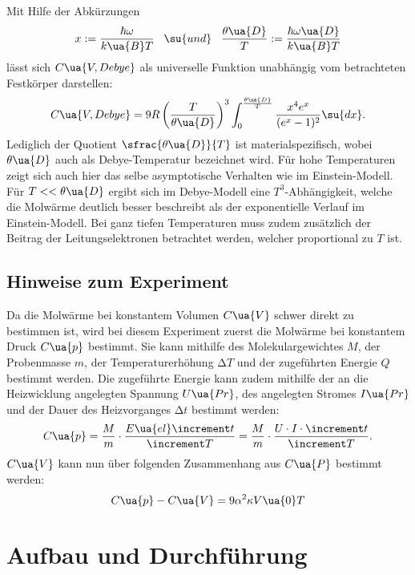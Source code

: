 Mit Hilfe der Abkürzungen
\begin{equation}
  x:=\frac{\hbar\omega}{k\ua{B}T} \,\,\,\,\, \su{und} \,\,\,\,\, \frac{\theta\ua{D}}{T} := \frac{\hbar\omega\ua{D}}{k\ua{B}T}
\end{equation}
lässt sich $C\ua{V,Debye}$ als universelle Funktion unabhängig vom betrachteten
Festkörper darstellen:
\begin{equation}
  C\ua{V,Debye} = 9R \left(\frac{T}{\theta\ua{D}}\right)^3\int_0^{\frac{\theta\ua{D}}{T}} \frac{x^4e^x}{(e^x-1)^2}\su{dx}.
\end{equation}
Lediglich der Quotient $\sfrac{\theta\ua{D}}{T}$ ist
materialspezifisch, wobei $\theta\ua{D}$ auch als Debye-Temperatur bezeichnet wird.
Für hohe Temperaturen zeigt sich auch hier das selbe asymptotische Verhalten wie
im Einstein-Modell. Für $T<<\theta\ua{D}$ ergibt sich im Debye-Modell eine $T^3$-Abhängigkeit,
welche die Molwärme deutlich besser beschreibt als der exponentielle Verlauf im
Einstein-Modell.
Bei ganz tiefen Temperaturen muss zudem zusätzlich der Beitrag der Leitungselektronen
betrachtet werden, welcher proportional zu $T$ ist.

\subsection{Hinweise zum Experiment}

Da die Molwärme bei konstantem Volumen $C\ua{V}$ schwer direkt zu bestimmen ist,
wird bei diesem Experiment zuerst die Molwärme bei konstantem Druck $C\ua{p}$
bestimmt. Sie kann mithilfe des Molekulargewichtes $M$, der Probenmasse $m$,
der Temperaturerhöhung $\increment T$ und der zugeführten Energie $Q$ bestimmt werden.
Die zugeführte Energie kann zudem mithilfe der an die Heizwicklung angelegten Spannung
$U\ua{Pr}$, des angelegten Stromes $I\ua{Pr}$ und der Dauer des Heizvorganges $\increment t$ bestimmt werden:
\begin{equation}
  \label{eqn:c_p}
  C\ua{p} = \frac{M}{m}\cdot\frac{E\ua{el}\increment t}{\increment T} = \frac{M}{m}\cdot\frac{U\cdot I\cdot \increment t}{\increment T}.
\end{equation}
$C\ua{V}$ kann nun über folgenden Zusammenhang aus $C\ua{P}$ bestimmt werden:
\begin{equation}
  \label{eqn:c_p-c_v}
  C\ua{p}-C\ua{V} = 9\alpha^2\kappa V\ua{0}T
\end{equation}

\newpage

\section{Aufbau und Durchführung}

